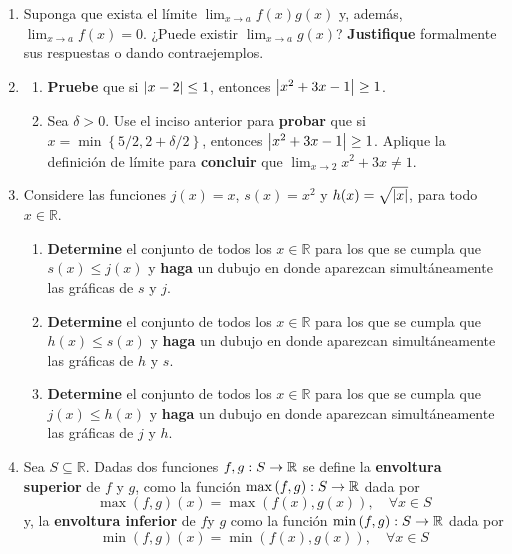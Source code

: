 \documentclass[12pt]{article}
\begin{document}
\begin{enumerate}
\begin{proof}
        De (ii): 
    \end{proof}

    \item Suponga que exista el límite $\lim_{x\rightarrow a}f(x)g(x)$ y, además, $\lim_{x\rightarrow a}f(x)=0$. ¿Puede existir $\lim_{x\rightarrow a}g(x)$? \textbf{Justifique} formalmente sus respuestas o dando contraejemplos.
    \item \begin{enumerate}
        \item \textbf{Pruebe} que si $\left| x-2 \right|\leq1$, entonces $\left| x^2+3x-1 \right|\geq1$.
        \item Sea $\delta>0$. Use el inciso anterior para \textbf{probar} que si $x=\min\left\{5/2,2+\delta/2 \right\}$, entonces $\left| x^2+3x-1 \right|\geq1$. Aplique la definición de límite para \textbf{concluir} que $\lim_{x\rightarrow2}x^2+3x\neq1$.
    \end{enumerate}
    \item Considere las funciones $j(x)=x$, $s(x)=x^2$ y $h(x)=\sqrt{\left| x \right|}$, para todo $x\in\mathbb{R}$.
    \begin{enumerate}
        \item \textbf{Determine} el conjunto de todos los $x\in\mathbb{R}$ para los que se cumpla que $s(x)\leq j(x)$ y \textbf{haga} un dubujo en donde aparezcan simultáneamente las gráficas de $s$ y $j$.
        \item \textbf{Determine} el conjunto de todos los $x\in\mathbb{R}$ para los que se cumpla que $h(x)\leq s(x)$ y \textbf{haga} un dubujo en donde aparezcan simultáneamente las gráficas de $h$ y $s$.
        \item \textbf{Determine} el conjunto de todos los $x\in\mathbb{R}$ para los que se cumpla que $j(x)\leq h(x)$ y \textbf{haga} un dubujo en donde aparezcan simultáneamente las gráficas de $j$ y $h$.
    \end{enumerate}
    \item Sea $S\subseteq\mathbb{R}$. Dadas dos funciones $f,g:S\rightarrow\mathbb{R}$ se define la \textbf{envoltura superior} de $f$ y $g$, como la función $\max\left(f,g\right):S\rightarrow\mathbb{R}$ dada por
    \begin{equation*}
        \max\left(f,g\right)(x)=\max\left(f(x),g(x)\right),\quad\forall x\in S
    \end{equation*}
    y, la \textbf{envoltura inferior} de $f$y $g$ como la función $\min\left(f,g\right):S\rightarrow\mathbb{R}$ dada por
    \begin{equation*}
        \min\left(f,g\right)(x)=\min\left(f(x),g(x)\right),\quad\forall x\in S

\end{equation*}
\end{enumerate}
\end{document}
